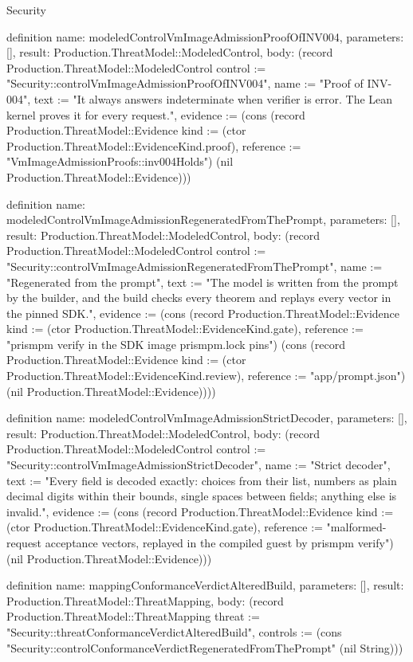 \begin{lexlean}{Security}
\begin{semanticmodule}
definition{
  name: modeledControlVmImageAdmissionProofOfINV004,
  parameters: [],
  result: Production.ThreatModel::ModeledControl,
  body: (record Production.ThreatModel::ModeledControl {control := "Security::controlVmImageAdmissionProofOfINV004", name := "Proof of INV-004", text := "It always answers indeterminate when verifier is error. The Lean kernel proves it for every request.", evidence := (cons (record Production.ThreatModel::Evidence {kind := (ctor Production.ThreatModel::EvidenceKind.proof), reference := "VmImageAdmissionProofs::inv004Holds"}) (nil Production.ThreatModel::Evidence))})
}

definition{
  name: modeledControlVmImageAdmissionRegeneratedFromThePrompt,
  parameters: [],
  result: Production.ThreatModel::ModeledControl,
  body: (record Production.ThreatModel::ModeledControl {control := "Security::controlVmImageAdmissionRegeneratedFromThePrompt", name := "Regenerated from the prompt", text := "The model is written from the prompt by the builder, and the build checks every theorem and replays every vector in the pinned SDK.", evidence := (cons (record Production.ThreatModel::Evidence {kind := (ctor Production.ThreatModel::EvidenceKind.gate), reference := "prismpm verify in the SDK image prismpm.lock pins"}) (cons (record Production.ThreatModel::Evidence {kind := (ctor Production.ThreatModel::EvidenceKind.review), reference := "app/prompt.json"}) (nil Production.ThreatModel::Evidence)))})
}

definition{
  name: modeledControlVmImageAdmissionStrictDecoder,
  parameters: [],
  result: Production.ThreatModel::ModeledControl,
  body: (record Production.ThreatModel::ModeledControl {control := "Security::controlVmImageAdmissionStrictDecoder", name := "Strict decoder", text := "Every field is decoded exactly: choices from their list, numbers as plain decimal digits within their bounds, single spaces between fields; anything else is invalid.", evidence := (cons (record Production.ThreatModel::Evidence {kind := (ctor Production.ThreatModel::EvidenceKind.gate), reference := "malformed-request acceptance vectors, replayed in the compiled guest by prismpm verify"}) (nil Production.ThreatModel::Evidence))})
}

definition{
  name: mappingConformanceVerdictAlteredBuild,
  parameters: [],
  result: Production.ThreatModel::ThreatMapping,
  body: (record Production.ThreatModel::ThreatMapping {threat := "Security::threatConformanceVerdictAlteredBuild", controls := (cons "Security::controlConformanceVerdictRegeneratedFromThePrompt" (nil String))})
}


\end{semanticmodule}
\end{lexlean}
